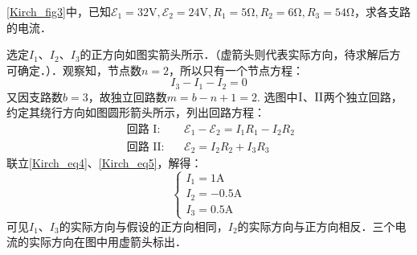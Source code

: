 \begin{example}{}
\autoref{Kirch_fig3}中，已知$\mathscr{E}_{1}=32 \mathrm{V}, \mathscr{E}_{2}=24 \mathrm{V}, R_{1}=5 \mathrm{\Omega}, R_{2}=6 \mathrm{\Omega}, R_{3}=54 \mathrm{Ω}$，求各支路的电流．

选定$I_1$、$I_2$、$I_3$的正方向如图实箭头所示．（虚箭头则代表实际方向，待求解后方可确定．）．观察知，节点数$n =2$，所以只有一个节点方程：
\begin{equation} \label{Kirch_eq4}
I_{3}-I_{1}-I_{2}=0
\end{equation}
又因支路数$b=3$，故独立回路数$m = b - n + 1 =2 $. 选图中$\rm I$、$\rm II$两个独立回路，约定其绕行方向如图圆形箭头所示，列出回路方程：
\begin{equation} \label{Kirch_eq5}
\begin{aligned}\text { 回路 } \mathrm{I}: && \mathscr{E}_{1}-\mathscr{E}_{2}=I_{1} R_{1}-I_{2} R_{2} \\ \text { 回路 } \mathrm{II}: && \mathscr{E}_{2}=I_{2} R_{2}+I_{3} R_{3}\end{aligned}
\end{equation}
联立\autoref{Kirch_eq4}、\autoref{Kirch_eq5}，解得：
\begin{equation}
\begin{cases}
I_{1}=1 \mathrm{A} \\ 
I_{2}=-0.5 \mathrm{A} \\
I_{3}=0.5 \mathrm{A}
\end{cases}
\end{equation}
可见$I_1$、$I_3$的实际方向与假设的正方向相同，$I_2$的实际方向与正方向相反．三个电流的实际方向在图中用虚箭头标出．
\end{example}

